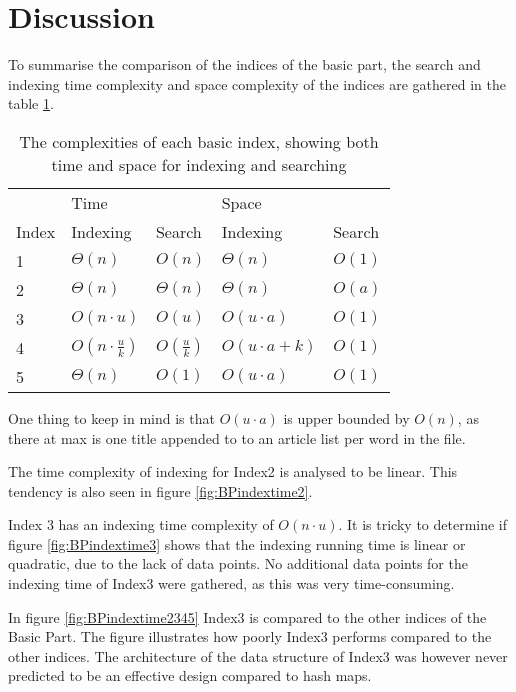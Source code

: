 \section{Discussion}

To summarise the comparison of the indices of the basic part, the search and indexing time complexity and space complexity of the indices are gathered in the table \ref{tab:basicpartTimecomplexity}. 

\begin{table}[th!]
\centering
\begin{tabular}{l|ll|ll}
            & Time &     & Space & \\
    Index & Indexing & Search & Indexing & Search\\
\hline
1 &  $\Theta(n)$                &  $O(n)$  &  $\Theta(n)$   & $O(1)$ \\
2 &  $\Theta(n)$                &  $\Theta(n)$  &  $\Theta(n)$   & $O(a)$         \\
3  &  $O(n\cdot u)$             &  $O(u)$  &  $O(u\cdot a )$ & $O(1)$         \\
4  &  $O(n\cdot \frac{u}{k})$   &  $O(\frac{u}{k})$  &  $O(u\cdot a + k)$ & $O(1)$ \\
5  &  $\Theta(n)$   &  $O(1)$  &  $O(u\cdot a)$ & $O(1)$         
\end{tabular}
\caption{The complexities of each basic index, showing both time and space for indexing and searching}
\label{tab:basicpartTimecomplexity}
\end{table}

One thing to keep in mind is that $O(u\cdot a)$ is upper bounded by $O(n)$, as there at max is one title appended to to an article list per word in the file.

The time complexity of indexing for Index2 is analysed to be linear. This tendency is also seen in figure \ref{fig:BPindextime2}.

Index 3 has an indexing time complexity of $O(n\cdot u)$. It is tricky to determine if figure \ref{fig:BPindextime3} shows that the indexing running time is linear or quadratic, due to the lack of data points. No additional data points for the indexing time of Index3 were gathered, as this was very time-consuming. 

In figure \ref{fig:BPindextime2345} Index3 is compared to the other indices of the Basic Part. The figure illustrates how poorly Index3 performs compared to the other indices. The architecture of the data structure of Index3 was however never predicted to be an effective design compared to hash maps. 

